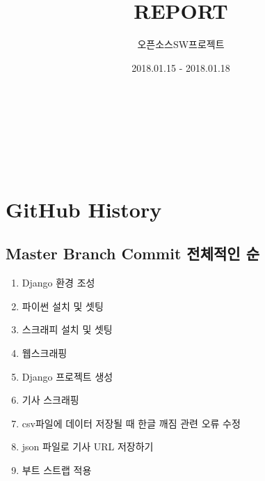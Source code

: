 \documentclass[aps,10pt,a4paper]{article}
\begin{document}


\title{\huge{REPORT}}   %



\author{ 오픈소스SW프로젝트 }         %
\date{2018.01.15 - 2018.01.18}    %
\maketitle

\ \\ \\ \\ \\ 






\section{GitHub History}
\subsection{Master Branch Commit 전체적인 순}

\begin{enumerate}
\item Django 환경 조성
\item 파이썬 설치 및 셋팅
\item 스크래피 설치 및 셋팅
\item 웹스크래핑
\item Django 프로젝트 생성 
\item 기사 스크래핑
\item csv파일에 데이터 저장될 때 한글 깨짐 관련 오류 수정
\item json 파일로 기사 URL 저장하기
\item 부트 스트랩 적용
\end{enumerate}
\ \\ \\ \\ \\ \\ \\ \\ \\ \\ \\ \\ \\ \\ \\ \\ 
\end{document}
